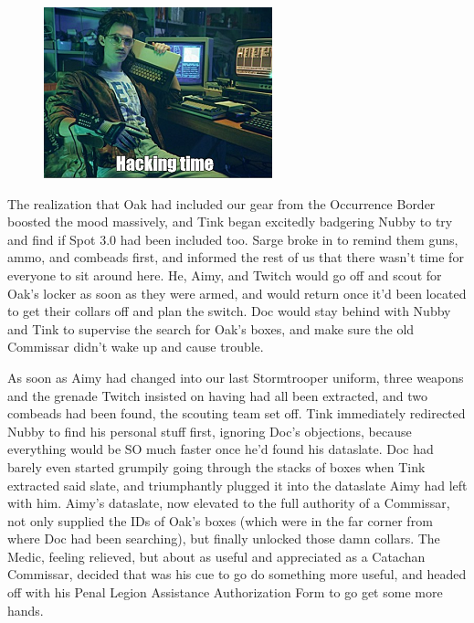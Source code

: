 \begin{figure}
	\begin{center}
		\includegraphics[width=\figwidth]{pics/21/76.png}
	\end{center}
\end{figure}
The realization that Oak had included our gear from the Occurrence Border boosted the mood massively, and Tink began excitedly badgering Nubby to try and find if Spot 3.0 had been included too. 
Sarge broke in to remind them guns, ammo, and combeads first, and informed the rest of us that there wasn't time for everyone to sit around here. 
He, Aimy, and Twitch would go off and scout for Oak's locker as soon as they were armed, and would return once it'd been located to get their collars off and plan the switch. 
Doc would stay behind with Nubby and Tink to supervise the search for Oak's boxes, and make sure the old Commissar didn't wake up and cause trouble.

As soon as Aimy had changed into our last Stormtrooper uniform, three weapons and the grenade Twitch insisted on having had all been extracted, and two combeads had been found, the scouting team set off. 
Tink immediately redirected Nubby to find his personal stuff first, ignoring Doc's objections, because everything would be SO much faster once he'd found his dataslate. 
Doc had barely even started grumpily going through the stacks of boxes when Tink extracted said slate, and triumphantly plugged it into the dataslate Aimy had left with him. 
Aimy's dataslate, now elevated to the full authority of a Commissar, not only supplied the IDs of Oak's boxes (which were in the far corner from where Doc had been searching), but finally unlocked those damn collars. 
The Medic, feeling relieved, but about as useful and appreciated as a Catachan Commissar, decided that was his cue to go do something more useful, and headed off with his Penal Legion Assistance Authorization Form to go get some more hands.

